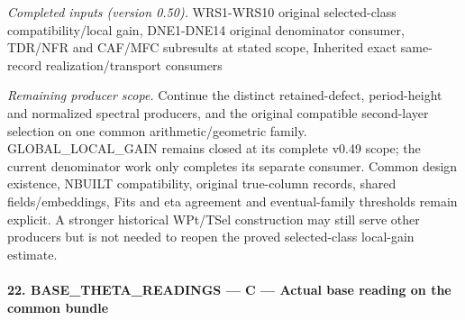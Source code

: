 \emph{Completed inputs (version 0.50).} WRS1-WRS10 original selected-class compatibility/local gain, DNE1-DNE14 original denominator consumer, TDR/NFR and CAF/MFC subresults at stated scope, Inherited exact same-record realization/transport consumers

\emph{Remaining producer scope.} Continue the distinct retained-defect, period-height and normalized spectral producers, and the original compatible second-layer selection on one common arithmetic/geometric family. GLOBAL\_\allowbreak LOCAL\_\allowbreak GAIN remains closed at its complete v0.49 scope; the current denominator work only completes its separate consumer. Common design existence, NBUILT compatibility, original true-column records, shared fields/embeddings, Fits and eta agreement and eventual-family thresholds remain explicit. A stronger historical WPt/TSel construction may still serve other producers but is not needed to reopen the proved selected-class local-gain estimate.



\paragraph{22. BASE\_\allowbreak THETA\_\allowbreak READINGS — C — Actual base reading on the common bundle}

